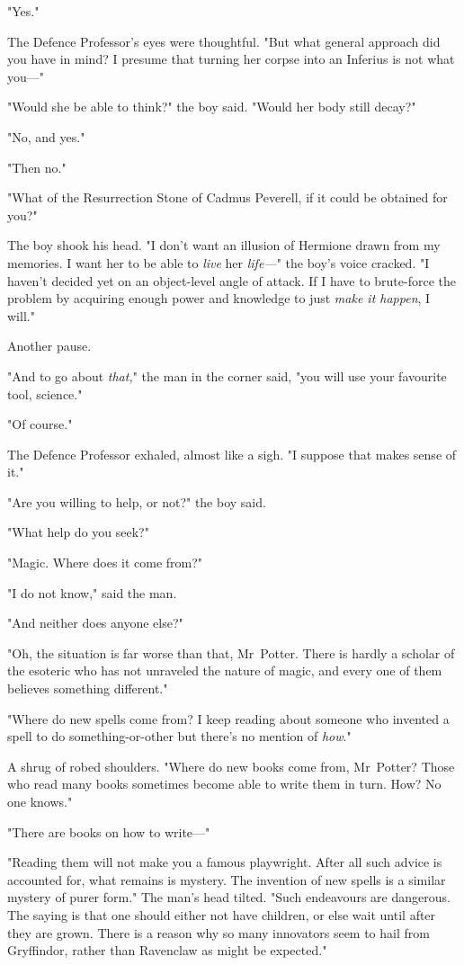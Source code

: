 "Yes."

The Defence Professor's eyes were thoughtful. "But what general approach did
you have in mind? I presume that turning her corpse into an Inferius is not
what you---"

"Would she be able to think?" the boy said. "Would her body still decay?"

"No, and yes."

"Then no."

"What of the Resurrection Stone of Cadmus Peverell, if it could be obtained for
you?"

The boy shook his head. "I don't want an illusion of Hermione drawn from my
memories. I want her to be able to \emph{live} her \emph{life---}" the boy's
voice cracked. "I haven't decided yet on an object-level angle of attack. If I
have to brute-force the problem by acquiring enough power and knowledge to just
\emph{make it happen}, I will."

Another pause.

"And to go about \emph{that,}" the man in the corner said, "you will use your
favourite tool, science."

"Of course."

The Defence Professor exhaled, almost like a sigh. "I suppose that makes sense
of it."

"Are you willing to help, or not?" the boy said.

"What help do you seek?"

"Magic. Where does it come from?"

"I do not know," said the man.

"And neither does anyone else?"

"Oh, the situation is far worse than that, Mr~Potter. There is hardly a
scholar of the esoteric who has not unraveled the nature of magic, and every
one of them believes something different."

"Where do new spells come from? I keep reading about someone who invented a
spell to do something-or-other but there's no mention of \emph{how}."

A shrug of robed shoulders. "Where do new books come from, Mr~Potter? Those
who read many books sometimes become able to write them in turn. How? No one
knows."

"There are books on how to write---"

"Reading them will not make you a famous playwright. After all such advice is
accounted for, what remains is mystery. The invention of new spells is a
similar mystery of purer form." The man's head tilted. "Such endeavours are
dangerous. The saying is that one should either not have children, or else wait
until after they are grown. There is a reason why so many innovators seem to
hail from Gryffindor, rather than Ravenclaw as might be expected."

